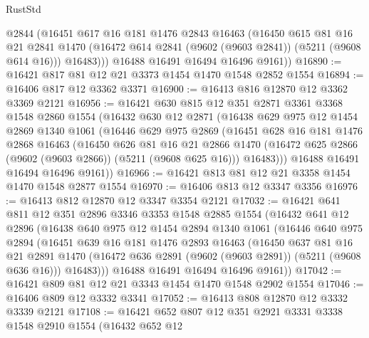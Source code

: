 \begin{lexlean}{RustStd}
\begin{coremodule}
          @2844
          (@16451
            @617
            @16
            @181
            @1476
            @2843
            @16463
            (@16450
              @615
              @81
              @16
              @21
              @2841
              @1470
              (@16472 @614 @2841 (@9602 (@9603 @2841)) (@5211 (@9608 @614 @16)))
              @16483)))
        @16488
        @16491
        @16494
        @16496
        @9161))
@16890 := @16421 @817 @81 @12 @21 @3373 @1454 @1470 @1548 @2852 @1554
@16894 := @16406 @817 @12 @3362 @3371
@16900 := @16413 @816 @12870 @12 @3362 @3369 @2121
@16956 := @16421
    @630
    @815
    @12
    @351
    @2871
    @3361
    @3368
    @1548
    @2860
    @1554
    (@16432
      @630
      @12
      @2871
      (@16438
        @629
        @975
        @12
        @1454
        @2869
        @1340
        @1061
        (@16446
          @629
          @975
          @2869
          (@16451
            @628
            @16
            @181
            @1476
            @2868
            @16463
            (@16450
              @626
              @81
              @16
              @21
              @2866
              @1470
              (@16472 @625 @2866 (@9602 (@9603 @2866)) (@5211 (@9608 @625 @16)))
              @16483)))
        @16488
        @16491
        @16494
        @16496
        @9161))
@16966 := @16421 @813 @81 @12 @21 @3358 @1454 @1470 @1548 @2877 @1554
@16970 := @16406 @813 @12 @3347 @3356
@16976 := @16413 @812 @12870 @12 @3347 @3354 @2121
@17032 := @16421
    @641
    @811
    @12
    @351
    @2896
    @3346
    @3353
    @1548
    @2885
    @1554
    (@16432
      @641
      @12
      @2896
      (@16438
        @640
        @975
        @12
        @1454
        @2894
        @1340
        @1061
        (@16446
          @640
          @975
          @2894
          (@16451
            @639
            @16
            @181
            @1476
            @2893
            @16463
            (@16450
              @637
              @81
              @16
              @21
              @2891
              @1470
              (@16472 @636 @2891 (@9602 (@9603 @2891)) (@5211 (@9608 @636 @16)))
              @16483)))
        @16488
        @16491
        @16494
        @16496
        @9161))
@17042 := @16421 @809 @81 @12 @21 @3343 @1454 @1470 @1548 @2902 @1554
@17046 := @16406 @809 @12 @3332 @3341
@17052 := @16413 @808 @12870 @12 @3332 @3339 @2121
@17108 := @16421
    @652
    @807
    @12
    @351
    @2921
    @3331
    @3338
    @1548
    @2910
    @1554
    (@16432
      @652
      @12

\end{coremodule}
\end{lexlean}
